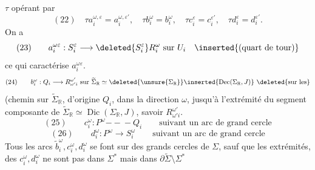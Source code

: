 $\tau$ opérant par
\[
(22)\quad \tau a_i^{\omega,\varepsilon}=a_i^{\omega,\varepsilon'},\quad
\tau b_i^\omega=b_i^\omega,\quad \tau c_i^\varepsilon=c_i^{\varepsilon'},\quad \tau d_i^\varepsilon=d_i^{\varepsilon'}.
\]
On a
\[
(23)\qquad a_i^{\omega\varepsilon}:S_i^\varepsilon\longrightarrow\deleted{S_i^\varepsilon}R_i^\omega\text{ sur }U_i\quad\inserted{(\text{quart de tour})}
\]
ce qui caractérise $a_i^{\omega\varepsilon}$. 
\[
(24)\qquad b_i^\omega:Q_i\longrightarrow R_{\omega'i}^{\omega'}\text{ sur }\widetilde\Sigma_{\mathbb R}\simeq\deleted{\unsure{\Sigma_{\mathbb R}}}\inserted{\operatorname{Dec}(\Sigma_{\mathbb R},J)}\ \deleted{\text{sur les}}
\]
(chemin sur $\widetilde\Sigma_{\mathbb R}$, d'origine $Q_i$, dans la direction $\omega$, jusqu'à l'extrémité  du segment composante de $\widetilde\Sigma_{\mathbb R}\simeq\operatorname{Dic}(\Sigma_{\mathbb R},J)$, savoir $R_{\omega'i}^{\omega'}$.
\[
(25)\qquad c_i^\omega:P^\omega\mathrel{-\!\!\!-\!\!\!-}Q_i\qquad\text{suivant un arc de grand cercle}
\]
\[
(26)\qquad d_i^\omega:P^\omega\longrightarrow S_i^\omega\qquad\text{suivant un arc de grand cercle}
\]
Tous les arcs $\widetilde b_i^\omega,c_i^\omega,d_i^\omega$ se font sur des grands cercles de $\Sigma$, sauf que les extrémités, des $c_i^\omega,d_i^\omega$ ne sont pas dans $\Sigma^*$ mais dans  $\partial\widetilde\Sigma\setminus\Sigma^*$
